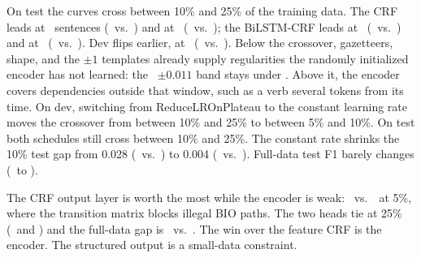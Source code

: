 \documentclass[10pt,twocolumn]{article}
\newif\ifshowtodos \showtodosfalse %
\newcommand{\todo}[1]{\ifshowtodos{\color{red!70!black}\textbf{[TODO:} #1\textbf{]}}\fi}
\begin{document}
\todo{Crossover discussion (graded: ``crossover discussed''). Where do the curves
cross, and why is each model ahead on its side of the crossover? Facts: on test
the CRF leads at 5\% (\crfTestFive\ vs \lstmTestFive) and 10\% (\crfTestTen\ vs
\lstmTestTen); the BiLSTM-CRF leads at 25\% (\lstmTestTwentyFive\ vs
\crfTestTwentyFive) and 100\% (\lstmTestFull\ vs \crfTestFull). On dev the
crossover is earlier (10\%: \crfDevTenFrac\ vs \lstmDevTen).}

\todo{What the CRF output layer buys the BiLSTM: compare BiLSTM-CRF and
BiLSTM+softmax across sizes (5\%: \lstmTestFive\ vs \smTestFive; 100\%:
\lstmTestFull\ vs \smTestFull).}

\todo{Honesty notes, 1--2 sentences: single CRF run per point (deterministic);
3 seeds for small BiLSTM runs. An earlier BiLSTM recipe with ReduceLROnPlateau
under-trained the small-data runs (old test F1 at 5\%: \oldLstmTestFive; 100\%:
\oldLstmTestFull); switching to a constant lr was chosen on dev and moved the
crossover.}

On test the curves cross between 10\% and 25\% of the training data.
The CRF leads at \nSentFive\ sentences (\crfTestFive\ vs.\ \lstmTestFive) and at
\nSentTen\ (\crfTestTen\ vs.\ \lstmTestTen); the BiLSTM-CRF leads at
\nSentTwentyFive\ (\lstmTestTwentyFive\ vs.\ \crfTestTwentyFive) and at
\nSentFull\ (\lstmTestFull\ vs.\ \crfTestFull).
Dev flips earlier, at \nSentTen\ (\lstmDevTen\ vs.\ \crfDevTenFrac).
Below the crossover, gazetteers, shape, and the $\pm1$ templates already supply
regularities the randomly initialized encoder has not learned: the
\lstmTestFive\ $\pm 0.011$ band stays under \crfTestFive.
Above it, the encoder covers dependencies outside that window, such as a verb
several tokens from its time.
On dev, switching from ReduceLROnPlateau to the constant learning rate moves
the crossover from between 10\% and 25\% to between 5\% and 10\%.
On test both schedules still cross between 10\% and 25\%. The constant rate
shrinks the 10\% test gap from 0.028 (\crfTestTen\ vs.\ \oldLstmTestTen) to
0.004 (\crfTestTen\ vs.\ \lstmTestTen). Full-data test F1 barely changes
(\oldLstmTestFull\ to \lstmTestFull).

The CRF output layer is worth the most while the encoder is weak:
\lstmTestFive\ vs.\ \smTestFive\ at 5\%, where the transition matrix blocks
illegal BIO paths. The two heads tie at 25\% (\lstmTestTwentyFive\ and
\smTestTwentyFive) and the full-data gap is \lstmTestFull\ vs.\ \smTestFull.
The win over the feature CRF is the encoder. The structured output is a
small-data constraint.
\end{document}
